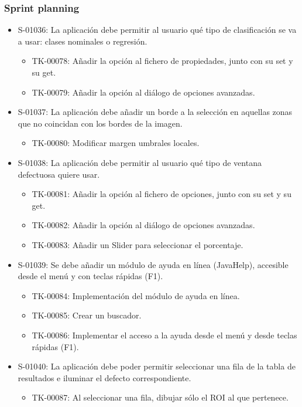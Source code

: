\subsubsection*{Sprint planning}
\begin{itemize}
 \item S-01036: La aplicación debe permitir al usuario qué tipo de clasificación se va a usar: clases nominales o regresión.
  \begin{itemize}
   \item TK-00078: Añadir la opción al fichero de propiedades, junto con su set y su get.
   \item TK-00079: Añadir la opción al diálogo de opciones avanzadas.
  \end{itemize}
 \item S-01037: La aplicación debe añadir un borde a la selección en aquellas zonas que no coincidan con los bordes de la imagen.
  \begin{itemize}
   \item TK-00080: Modificar margen umbrales locales.
  \end{itemize}
 \item S-01038: La aplicación debe permitir al usuario qué tipo de ventana defectuosa quiere usar.
  \begin{itemize}
   \item TK-00081: Añadir la opción al fichero de opciones, junto con su set y su get.
   \item TK-00082: Añadir la opción al diálogo de opciones avanzadas.
   \item TK-00083: Añadir un Slider para seleccionar el porcentaje.
  \end{itemize}
 \item S-01039: Se debe añadir un módulo de ayuda en línea (JavaHelp), accesible desde el menú y con teclas rápidas (F1).
  \begin{itemize}
   \item TK-00084: Implementación del módulo de ayuda en línea.
   \item TK-00085: Crear un buscador.
   \item TK-00086: Implementar el acceso a la ayuda desde el menú y desde teclas rápidas (F1).
  \end{itemize}
 \item S-01040: La aplicación debe poder permitir seleccionar una fila de la tabla de resultados e iluminar el defecto correspondiente.
  \begin{itemize}
   \item TK-00087: Al seleccionar una fila, dibujar sólo el ROI al que pertenece.

\end{itemize}
\end{itemize}
